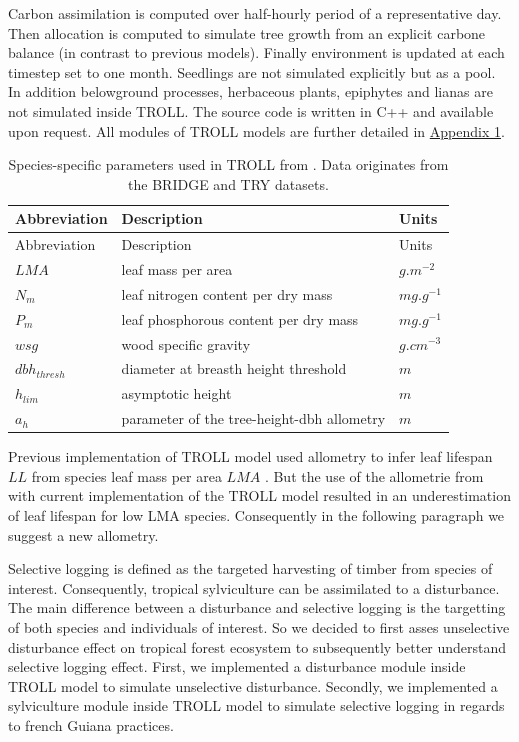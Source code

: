 \documentclass[12pt,]{article}
\theoremstyle{definition}
\theoremstyle{definition}
\theoremstyle{remark}
\begin{document}
Carbon assimilation is computed over half-hourly period of a
representative day. Then allocation is computed to simulate tree growth
from an explicit carbone balance (in contrast to previous models).
Finally environment is updated at each timestep set to one month.
Seedlings are not simulated explicitly but as a pool. In addition
belowground processes, herbaceous plants, epiphytes and lianas are not
simulated inside TROLL. The source code is written in C++ and available
upon request. All modules of TROLL models are further detailed in
\protect\hyperlink{appendix-1}{Appendix 1}.

\begin{longtable}[]{@{}lll@{}}
\caption{\label{tab:traits}Species-specific parameters used in TROLL from
\citet{Li}. Data originates from the BRIDGE \citep{Baraloto2010} and TRY
\citep{Kattge2011} datasets.}\tabularnewline
\toprule
Abbreviation & Description & Units\tabularnewline
\midrule
\endfirsthead
\toprule
Abbreviation & Description & Units\tabularnewline
\midrule
\endhead
\(LMA\) & leaf mass per area & \(g.m^{-2}\)\tabularnewline
\(N_m\) & leaf nitrogen content per dry mass &
\(mg.g^{-1}\)\tabularnewline
\(P_m\) & leaf phosphorous content per dry mass &
\(mg.g^{-1}\)\tabularnewline
\(wsg\) & wood specific gravity & \(g.cm^{-3}\)\tabularnewline
\(dbh_{thresh}\) & diameter at breasth height threshold &
\(m\)\tabularnewline
\(h_{lim}\) & asymptotic height & \(m\)\tabularnewline
\(a_h\) & parameter of the tree-height-dbh allometry &
\(m\)\tabularnewline
\bottomrule
\end{longtable}

Previous implementation of TROLL model used \citet{Reich1991a} allometry
to infer leaf lifespan \(LL\) from species leaf mass per area \(LMA\)
\citep[see \protect\hyperlink{appendix-1}{Appendix 1}]{Li}. But the use
of the allometrie from \citet{Reich1991a} with current implementation of
the TROLL model resulted in an underestimation of leaf lifespan for low
LMA species. Consequently in the following paragraph we suggest a new
allometry.

Selective logging is defined as the targeted harvesting of timber from
species of interest. Consequently, tropical sylviculture can be
assimilated to a disturbance. The main difference between a disturbance
and selective logging is the targetting of both species and individuals
of interest. So we decided to first asses unselective disturbance effect
on tropical forest ecosystem to subsequently better understand selective
logging effect. First, we implemented a disturbance module inside TROLL
model to simulate unselective disturbance. Secondly, we implemented a
sylviculture module inside TROLL model to simulate selective logging in
regards to french Guiana practices.
\end{document}

